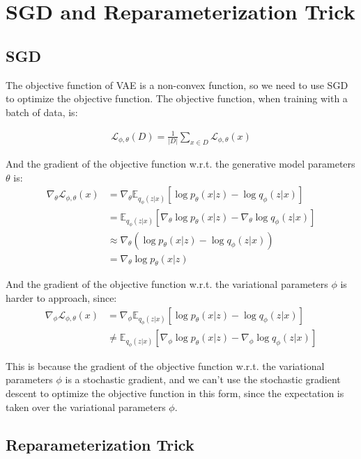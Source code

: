 \documentclass[11pt]{article}
\theoremstyle{definition}
\begin{document}
\section{SGD and Reparameterization Trick}

\subsection{SGD}

The objective function of VAE is a non-convex function, so we need to use SGD to optimize the objective function. The objective function, when training with a batch of data, is:

\begin{align}
    \mathcal{L}_{\phi, \theta}(D) = \frac{1}{|D|}\sum_{x \in D} \mathcal{L}_{\phi, \theta}(x)
\end{align}

And the gradient of the objective function w.r.t. the generative model parameters $\theta$ is:
\begin{align}
    \nabla_\theta \mathcal{L}_{\phi, \theta}(x) &= \nabla_\theta\mathbb{E}_{q_\phi(z|x)}[\log p_\theta(x|z) - \log q_\phi(z|x)]\\
    &= \mathbb{E}_{q_\phi(z|x)}[\nabla_\theta\log p_\theta(x|z) - \nabla_\theta\log q_\phi(z|x)]\\
    &\approx \nabla_\theta(\log p_\theta(x|z) - \log q_\phi(z|x))\\
    &= \nabla_\theta\log p_\theta(x|z)
\end{align}

And the gradient of the objective function w.r.t. the variational parameters $\phi$ is harder to approach, since:
\begin{align}
    \nabla_\phi \mathcal{L}_{\phi, \theta}(x) &= \nabla_\phi\mathbb{E}_{q_\phi(z|x)}[\log p_\theta(x|z) - \log q_\phi(z|x)]\\
    &\neq \mathbb{E}_{q_\phi(z|x)}[\nabla_\phi\log p_\theta(x|z) - \nabla_\phi\log q_\phi(z|x)]
\end{align}

This is because the gradient of the objective function w.r.t. the variational parameters $\phi$ is a stochastic gradient, and we can't use the stochastic gradient descent to optimize the objective function in this form, since the expectation is taken over the variational parameters $\phi$.

\subsection{Reparameterization Trick}
\end{document}
